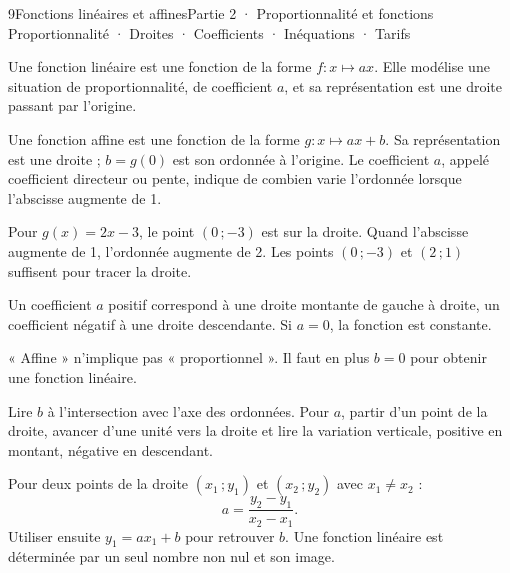 \begin{ouverture}[courbe]{9}{Fonctions linéaires et affines}{Partie 2 · Proportionnalité et fonctions}
{Proportionnalité · Droites · Coefficients · Inéquations · Tarifs}
\end{ouverture}
\pagestyle{otMain}\essentiel\fontsize{11}{15}\selectfont
{}
\begin{definition}Une fonction linéaire est une fonction de la forme $f:x\mapsto ax$. Elle modélise une situation de proportionnalité, de coefficient $a$, et sa représentation est une droite passant par l’origine.\end{definition}
\begin{definition}Une fonction affine est une fonction de la forme $g:x\mapsto ax+b$. Sa représentation est une droite ; $b=g(0)$ est son ordonnée à l’origine. Le coefficient $a$, appelé coefficient directeur ou pente, indique de combien varie l’ordonnée lorsque l’abscisse augmente de 1.\end{definition}
\begin{exemple}Pour $g(x)=2x-3$, le point $(0\,;-3)$ est sur la droite. Quand l’abscisse augmente de 1, l’ordonnée augmente de 2. Les points $(0\,;-3)$ et $(2\,;1)$ suffisent pour tracer la droite.\end{exemple}
\begin{propriete}Un coefficient $a$ positif correspond à une droite montante de gauche à droite, un coefficient négatif à une droite descendante. Si $a=0$, la fonction est constante.\end{propriete}
\begin{attention}« Affine » n’implique pas « proportionnel ». Il faut en plus $b=0$ pour obtenir une fonction linéaire.\end{attention}
\clearpage
{}
\begin{savoirfaire}Lire $b$ à l’intersection avec l’axe des ordonnées. Pour $a$, partir d’un point de la droite, avancer d’une unité vers la droite et lire la variation verticale, positive en montant, négative en descendant.\end{savoirfaire}
\begin{savoirfaire}Pour deux points de la droite $(x_1\,;y_1)$ et $(x_2\,;y_2)$ avec $x_1\ne x_2$ :
\[a=\frac{y_2-y_1}{x_2-x_1}.\]
Utiliser ensuite $y_1=ax_1+b$ pour retrouver $b$. Une fonction linéaire est déterminée par un seul nombre non nul et son image.\end{savoirfaire}
